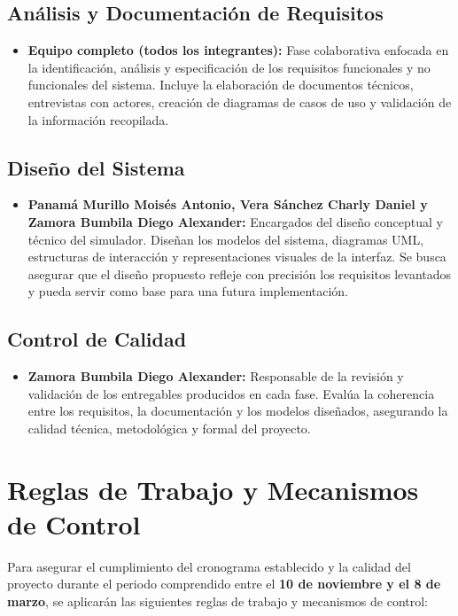 \documentclass[12pt]{article}
\begin{document}
\subsection{Análisis y Documentación de Requisitos}
\begin{itemize}
    \item \textbf{Equipo completo (todos los integrantes):} Fase colaborativa enfocada en la identificación, análisis y especificación de los requisitos funcionales y no funcionales del sistema. Incluye la elaboración de documentos técnicos, entrevistas con actores, creación de diagramas de casos de uso y validación de la información recopilada.
\end{itemize}

\subsection{Diseño del Sistema}
\begin{itemize}
    \item \textbf{Panamá Murillo Moisés Antonio, Vera Sánchez Charly Daniel y Zamora Bumbila Diego Alexander:} Encargados del diseño conceptual y técnico del simulador. Diseñan los modelos del sistema, diagramas UML, estructuras de interacción y representaciones visuales de la interfaz. Se busca asegurar que el diseño propuesto refleje con precisión los requisitos levantados y pueda servir como base para una futura implementación.
\end{itemize}

\subsection{Control de Calidad}
\begin{itemize}
    \item \textbf{Zamora Bumbila Diego Alexander:} Responsable de la revisión y validación de los entregables producidos en cada fase. Evalúa la coherencia entre los requisitos, la documentación y los modelos diseñados, asegurando la calidad técnica, metodológica y formal del proyecto.
\end{itemize}

\section{Reglas de Trabajo y Mecanismos de Control}
Para asegurar el cumplimiento del cronograma establecido y la calidad del proyecto durante el periodo comprendido entre el \textbf{10 de noviembre y el 8 de marzo}, se aplicarán las siguientes reglas de trabajo y mecanismos de control:
\end{document}
